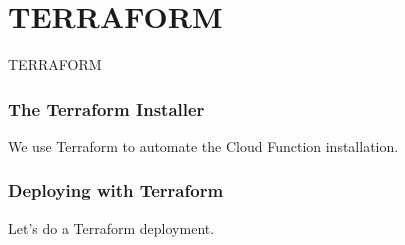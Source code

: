 \documentclass[aspectratio=169]{beamer}
\begin{document}
\section{TERRAFORM}
\begin{frame}
	\Huge \textcolor{dgreen}{TERRAFORM}
\end{frame}


\begin{frame}
	\frametitle{The Terraform Installer}

	We use Terraform to automate the Cloud Function installation.

\end{frame}

\begin{frame}
	\frametitle{Deploying with Terraform}

	Let's do a Terraform deployment.

\end{frame}

\end{document}
